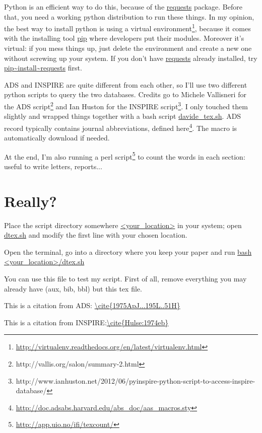 \documentclass[floats,floatfix,showpacs,amssymb,twocolumn,superscriptaddress,nofootinbib]{revtex4}
\begin{document}
Python is an efficient way to do this, because of the \url{requests} package. Before that, you need a working python distribution to run these things. In my opinion, the best way to install python is using a virtual environment\footnote{\url{http://virtualenv.readthedocs.org/en/latest/virtualenv.html}}, because it comes with the installing tool \url{pip} where developers put their modules. Moreover it's virtual: if you mess things up, just delete the environment and create a new one  without screwing up your system. If you don't have \url{requests} already installed, try \url{pip~install~requests} first.

ADS and INSPIRE are quite different from each other, so I'll use two different python scripts to query the two databases. Credits go to Michele Vallisneri for the ADS script\footnote{http://vallis.org/salon/summary-2.html} and Ian Huston for the INSPIRE script\footnote{http://www.ianhuston.net/2012/06/pyinspire-python-script-to-access-inspire-database/}. I only touched them slightly and wrapped things together with a bash script \url{davide_tex.sh}.
ADS record typically contains journal abbreviations, defined here\footnote{\url{http://doc.adsabs.harvard.edu/abs_doc/aas_macros.sty}}. The macro is automatically download if needed.

At the end, I'm also running a perl script\footnote{\url{http://app.uio.no/ifi/texcount/}} to count the words in each section: useful to write letters, reports...


\section{Really?}
Place the script directory somewhere \url{<your_location>} in your system; open \url{dtex.sh} and modify the first line with your chosen location.

Open the terminal, go into a directory where you keep your paper and run 
\url{bash <your_location>/dtex.sh}


You can use this file to test my script. First of all, remove everything  you may already have (aux, bib, bbl)  but this tex file.

This is a citation from ADS: \url{\cite{1975ApJ...195L..51H}} \cite{1975ApJ...195L..51H}

This is a citation from INSPIRE:\url{\cite{Hulse:1974eb}} \cite{Hulse:1974eb}




\cite{2008PhRvL.101p1101S}
\end{document}
